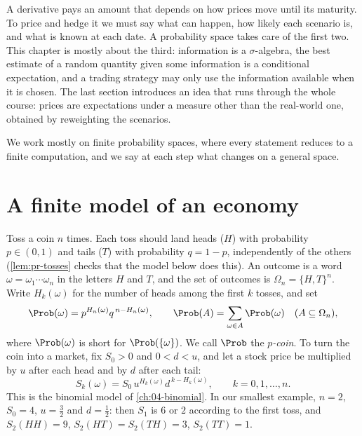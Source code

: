 
A derivative pays an amount that depends on how prices move until its maturity. To price
and hedge it we must say what can happen, how likely each scenario is, and what is known
at each date. A probability space takes care of the first two. This chapter is mostly
about the third: information is a $\sigma$-algebra, the best estimate of a random quantity
given some information is a conditional expectation, and a trading strategy may only use
the information available when it is chosen. The last section introduces an idea that
runs through the whole course: prices are expectations under a measure other than the
real-world one, obtained by reweighting the scenarios.

We work mostly on finite probability spaces, where every statement reduces to a finite
computation, and we say at each step what changes on a general space.

\section{A finite model of an economy}\label{sec:pr-finite}

Toss a coin $n$ times. Each toss should land heads ($H$) with probability $p\in(0,1)$ and
tails ($T$) with probability $q=1-p$, independently of the others (\cref{lem:pr-tosses}
checks that the model below does this). An outcome is a word
$\omega=\omega_1\cdots\omega_n$ in the letters $H$ and $T$, and the set of outcomes is
$\Omega_n=\{H,T\}^n$. Write $H_k(\omega)$ for the number of heads among the first $k$
tosses, and set
\begin{equation}\label{eq:pr-coin}
  \Prob(\omega)=p^{H_n(\omega)}q^{\,n-H_n(\omega)},\qquad \Prob(A)=\sum_{\omega\in A}\Prob(\omega)
  \quad(A\subseteq\Omega_n),
\end{equation}
where $\Prob(\omega)$ is short for $\Prob(\{\omega\})$. We call $\Prob$ the
\emph{$p$-coin}. To turn the coin into a market, fix $S_0>0$ and $0<d<u$, and let a stock
price be multiplied by $u$ after each head and by $d$ after each tail:
\begin{equation}\label{eq:pr-stock}
  S_k(\omega)=S_0\,u^{H_k(\omega)}d^{\,k-H_k(\omega)},\qquad k=0,1,\dots,n .
\end{equation}
This is the binomial model of \cref{ch:04-binomial}. In our smallest example, $n=2$,
$S_0=4$, $u=\frac32$ and $d=\frac12$: then $S_1$ is $6$ or $2$ according to the first toss,
and $S_2(HH)=9$, $S_2(HT)=S_2(TH)=3$, $S_2(TT)=1$.

